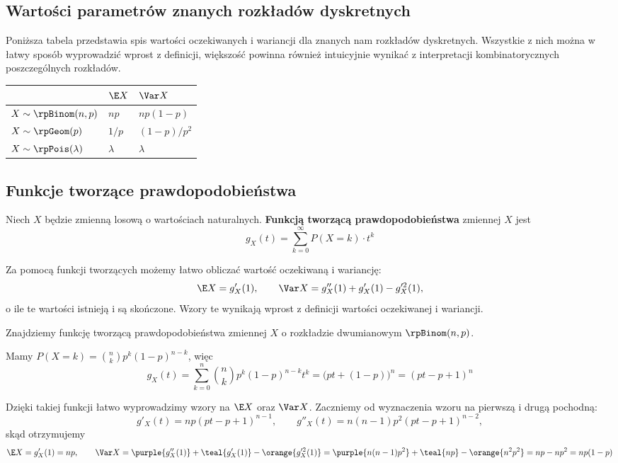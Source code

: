 \subsection{Wartości parametrów znanych rozkładów dyskretnych}

Poniższa tabela przedstawia spis wartości oczekiwanych i wariancji dla znanych nam rozkładów dyskretnych. Wszystkie z nich można w łatwy sposób wyprowadzić wprost z definicji, większość powinna również intuicyjnie wynikać z interpretacji kombinatorycznych poszczególnych rozkładów.

\begin{center}
\renewcommand{\arraystretch}{1.5}
\begin{tabular}{ C | C | C }
    & $\E X$ & $\Var X$ \\ \hline
    $X \sim \rpBinom(n, p)$ & $np$ & $np(1 - p)$ \\ \hline
    $X \sim \rpGeom(p)$ & $1/p$ & $(1 - p)/p^2$ \\ \hline
    $X \sim \rpPois(\lambda)$ & $\lambda$ & $\lambda$
\end{tabular}
\end{center}

\subsection{Funkcje tworzące prawdopodobieństwa}

Niech $X$ będzie zmienną losową o wartościach naturalnych. \textbf{Funkcją tworzącą prawdopodobieństwa} zmiennej $X$ jest
$$
g_X(t) = \sum_{k=0}^\infty P(X=k)\cdot t^k
$$

Za pomocą funkcji tworzących możemy łatwo obliczać wartość oczekiwaną i wariancję:
$$
\E X = g_X'(1), \qquad \Var X = g_X''(1) + g_X'(1) - g_X'^2(1),
$$
o ile te wartości istnieją i są skończone. Wzory te wynikają wprost z definicji wartości oczekiwanej i wariancji.

\begin{example}
    Znajdziemy funkcję tworzącą prawdopodobieństwa zmiennej $X$ o rozkładzie dwumianowym $\rpBinom(n, p)$.

    Mamy $P(X = k) = \binom{n}{k} p^k (1 - p)^{n - k}$, więc
    $$g_X(t) = \sum_{k = 0}^{n} \binom{n}{k} p^k (1 - p)^{n - k} t^k = \big(pt + (1 - p)\big)^n = (pt - p + 1)^n$$

    Dzięki takiej funkcji łatwo wyprowadzimy wzory na $\E X$ oraz $\Var X$. Zaczniemy od wyznaczenia wzoru na pierwszą i drugą pochodną:
    $$g'_X(t) = np(pt - p + 1)^{n - 1}, \qquad g''_X(t) = n(n - 1)p^2(pt - p + 1)^{n - 2},$$
    skąd otrzymujemy
    $$\E X = g'_X(1) = np, \qquad \Var X = \purple{g_X''(1)} + \teal{g_X'(1)} - \orange{g_X'^2(1)} = \purple{n(n - 1)p^2} + \teal{np} - \orange{n^2p^2} = np - np^2 = np(1 - p)$$
\end{example}

